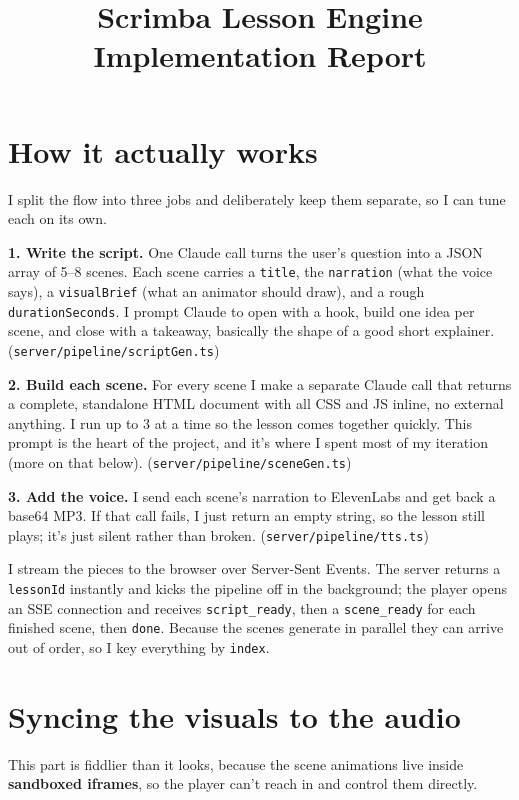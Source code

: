 \documentclass[11pt]{article}
\title{\textbf{Scrimba Lesson Engine\\[2pt]\large Implementation Report}}
\author{}
\date{}
\newcommand{\code}[1]{\texttt{#1}}
\begin{document}
\maketitle
\vspace{-2.5em}

\section*{How it actually works}

I split the flow into three jobs and deliberately keep them separate, so I can
tune each on its own.

\textbf{1. Write the script.} One Claude call turns the user's question into a JSON
array of 5--8 scenes. Each scene carries a \code{title}, the \code{narration} (what the
voice says), a \code{visualBrief} (what an animator should draw), and a rough
\code{durationSeconds}. I prompt Claude to open with a hook, build one idea
per scene, and close with a takeaway, basically the shape of a good short
explainer. (\code{server/pipeline/scriptGen.ts})

\textbf{2. Build each scene.} For every scene I make a separate Claude call that
returns a complete, standalone HTML document with all CSS and JS inline, no
external anything. I run up to 3 at a time so the lesson comes together
quickly. This prompt is the heart of the project, and it's where I spent most of
my iteration (more on that below). (\code{server/pipeline/sceneGen.ts})

\textbf{3. Add the voice.} I send each scene's narration to ElevenLabs and get back
a base64 MP3. If that call fails, I just return an empty string, so the lesson
still plays; it's just silent rather than broken. (\code{server/pipeline/tts.ts})

I stream the pieces to the browser over Server-Sent Events. The server returns a
\code{lessonId} instantly and kicks the pipeline off in the background; the player
opens an SSE connection and receives \code{script\_ready}, then a \code{scene\_ready}
for each finished scene, then \code{done}. Because the scenes generate in parallel
they can arrive out of order, so I key everything by \code{index}.

\section*{Syncing the visuals to the audio}

This part is fiddlier than it looks, because the scene animations live inside
\textbf{sandboxed iframes}, so the player can't reach in and control them directly.
\end{document}
